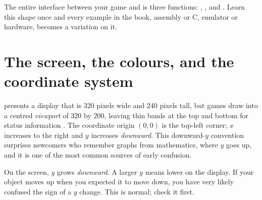 \begin{prgconcept}
The entire interface between your game and \prg is three functions:
, , and . Learn this shape once and every
example in the book, assembly or C, emulator or hardware, becomes a variation
on it.
\end{prgconcept}

\section{The screen, the colours, and the coordinate system}

\prg presents a display that is 320 pixels wide and 240 pixels tall, but games
draw into a centred \emph{viewport} of 320 by 200, leaving thin bands at the top
and bottom for status information \citep{prg32repo}. The coordinate origin
$(0,0)$ is the top-left corner; $x$ increases to the right and $y$ increases
\emph{downward}. This downward-$y$ convention surprises newcomers who remember
graphs from mathematics, where $y$ goes up, and it is one of the most common
sources of early confusion.

\begin{prgwarn}
On the screen, $y$ grows \emph{downward}. A larger $y$ means lower on the
display. If your object moves up when you expected it to move down, you have very
likely confused the sign of a $y$ change. This is normal; check it first.
\end{prgwarn}

\begin{center}
\label{fig:screen}
\end{center}

